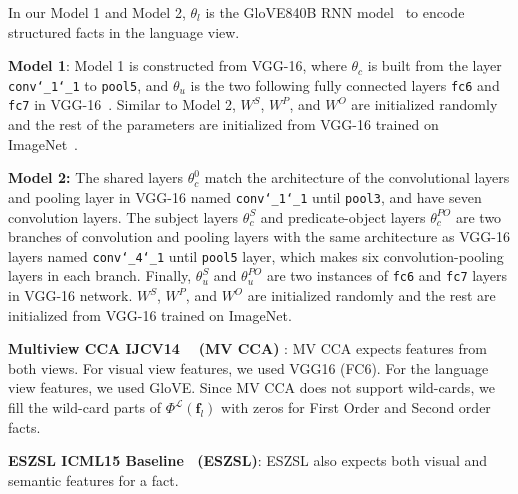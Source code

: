 \documentclass[runningheads]{llncs}
\begin{document}
In our Model 1 and Model 2, $\theta_l$ is the GloVE840B RNN model~\cite{pennington2014glove} to encode structured facts in the language view. %
\item{\textbf{Model 1}:} Model 1 is constructed from VGG-16, where  $\theta_c$ is built from the layer \texttt{conv\char`_1\char`_1} to \texttt{pool5}, and  $\theta_u$ is the two following fully connected layers \texttt{fc6} and  \texttt{fc7} in VGG-16~\cite{simonyan2014very}. Similar to Model 2,  $W^S$, $W^P$, and  $W^O$  are initialized randomly  and the rest of the parameters are initialized from VGG-16 trained on ImageNet~\cite{deng2009imagenet}.
\item \noindent\textbf{Model 2:} The shared layers $\theta_c^{0}$ match the architecture of the convolutional layers and pooling layer in VGG-16 named  \texttt{conv\char`_1\char`_1} until \texttt{pool3}, and have seven convolution layers. The subject layers $\theta_c^{S}$ and predicate-object layers $\theta_c^{{PO}}$ are two branches of convolution and pooling layers with the same architecture as VGG-16 layers  named  \texttt{conv\char`_4\char`_1} until \texttt{pool5} layer, which makes six convolution-pooling layers in each branch. Finally, $\theta_u^{S}$  and  $\theta_u^{{PO}}$ are two instances of \texttt{fc6} and \texttt{fc7} layers in VGG-16 network. 
$W^S$, $W^P$, and  $W^O$  are initialized randomly and the rest are initialized from VGG-16 trained on ImageNet.
	\item \textbf{Multiview CCA IJCV14 ~\cite{gong2014multi} (MV CCA) }: MV CCA expects features from both views. For visual view features, we used VGG16 (FC6). 
For the language view features, we used GloVE.
Since MV CCA does not support wild-cards, we fill the wild-card parts of $\Phi^\mathcal{L}(\mathbf{f}_l)$ with zeros for First Order and Second order facts. 	 
	\item \textbf{ESZSL ICML15 Baseline~\cite{romera2015embarrassingly} (ESZSL)}: ESZSL also expects both visual and semantic features for a fact.
\end{document}
